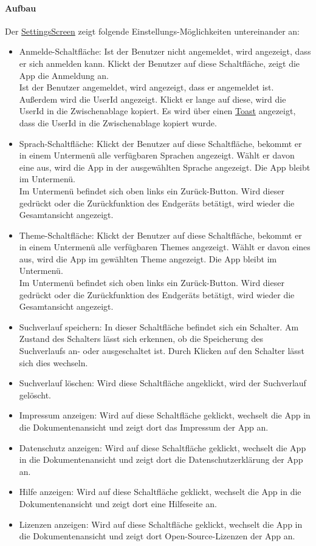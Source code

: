 \paragraph*{Aufbau}
Der \hyperref[App_Settings_SettingsScreen]{SettingsScreen} zeigt folgende Einstellungs-Möglichkeiten untereinander an:
\begin{itemize}
    \item Anmelde-Schaltfläche: Ist der Benutzer nicht angemeldet, wird angezeigt, dass er sich anmelden kann. 
    Klickt der Benutzer auf diese Schaltfläche, zeigt die App die Anmeldung an.\\
    Ist der Benutzer angemeldet, wird angezeigt, dass er angemeldet ist. Außerdem wird die UserId angezeigt. 
    Klickt er lange auf diese, wird die UserId in die Zwischenablage kopiert. 
    Es wird über einen \href{https://developer.android.com/guide/topics/ui/notifiers/toasts}{Toast} angezeigt, dass 
    die UserId in die Zwischenablage kopiert wurde.
    \item Sprach-Schaltfläche: Klickt der Benutzer auf diese Schaltfläche, bekommt er in einem Untermenü alle verfügbaren Sprachen angezeigt. 
    Wählt er davon eine aus, wird die App in der ausgewählten Sprache angezeigt. Die App bleibt im Untermenü.\\
    Im Untermenü befindet sich oben links ein Zurück-Button. Wird dieser gedrückt oder die Zurückfunktion des Endgeräts betätigt, 
    wird wieder die Gesamtansicht angezeigt.
    \item Theme-Schaltfläche: Klickt der Benutzer auf diese Schaltfläche, bekommt er in einem Untermenü alle verfügbaren Themes angezeigt. 
    Wählt er davon eines aus, wird die App im gewählten Theme angezeigt. Die App bleibt im Untermenü.\\
    Im Untermenü befindet sich oben links ein Zurück-Button. Wird dieser gedrückt oder die Zurückfunktion des Endgeräts betätigt, 
    wird wieder die Gesamtansicht angezeigt.
    \item Suchverlauf speichern: In dieser Schaltfläche befindet sich ein Schalter. 
    Am Zustand des Schalters lässt sich erkennen, ob die Speicherung des Suchverlaufs an- oder ausgeschaltet ist. 
    Durch Klicken auf den Schalter lässt sich dies wechseln.
    \item Suchverlauf löschen: Wird diese Schaltfläche angeklickt, wird der Suchverlauf gelöscht.
    \item Impressum anzeigen: Wird auf diese Schaltfläche geklickt, wechselt die App in die Dokumentenansicht und zeigt dort das Impressum der App an.
    \item Datenschutz anzeigen: Wird auf diese Schaltfläche geklickt, wechselt die App in die Dokumentenansicht und zeigt dort die Datenschutzerklärung der App an.
    \item Hilfe anzeigen: Wird auf diese Schaltfläche geklickt, wechselt die App in die Dokumentenansicht und zeigt dort eine Hilfeseite an.
    \item Lizenzen anzeigen: Wird auf diese Schaltfläche geklickt, wechselt die App in die Dokumentenansicht und zeigt dort Open-Source-Lizenzen der App an.
\end{itemize}

